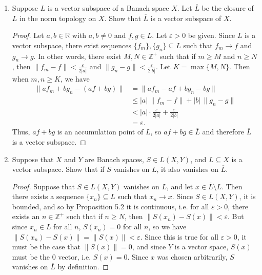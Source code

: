 \documentclass[11pt,oneside,english]{amsart}
\theoremstyle{definition}
\newcommand{\ve}{\varepsilon}
\newcommand{\MB}[1]{\mathbb{#1}}
\begin{document}
\rightline{\today}



\vspace{5mm}
\begin{enumerate}
\itemsep7mm





\item Suppose $L$ is a vector subspace of a Banach space $X$. Let $\overline{L}$ be the closure of $L$ in the norm topology on $X$. Show that $\overline{L}$ is a vector subspace of $X$.

\begin{proof}
Let $a,b\in \MB{R}$ with $a,b\neq0$ and $f,g\in \overline{L}$. Let $\ve>0$ be given. Since $L$ is a vector subspace, there exist sequences $\{f_m\},\{g_n\}\subseteq L$ such that $f_m\to f$ and $g_n\to g$. In other words, there exist $M,N\in\MB{Z}^+$ such that if $m\geq M$ and $n\geq N$, then $\|f_m-f\|<\frac{\ve}{2|a|}$ and $\|g_n-g\|<\frac{\ve}{2|b|}$. Let $K=\max\{M,N\}$. Then when $m,n\geq K$, we have
\begin{align*}
\|af_m+bg_n-(af+bg)\|&=\|af_m-af+bg_n-bg\|\\[2mm]
&\leq|a|\,\|f_m-f\|+|b|\,\|g_n-g\|\\[2mm]
&<|a|\cdot\frac{\ve}{2|a|}+\frac{\ve}{2|b|}\\
&=\ve.
\end{align*}
Thus, $af+bg$ is an accumulation point of $L$, so $af+bg\in\overline{L}$ and therefore $\overline{L}$ is a vector subspace.
\end{proof}

\item Suppose that $X$ and $Y$ are Banach spaces, $S \in L(X,Y)$, and $L \subseteq X$ is a vector subspace.  Show that if $S$ vanishes on $L$, it also vanishes on $\overline{L}$.

\begin{proof}
Suppose that $S\in L(X,Y)$ vanishes on $L$, and let $x\in\overline{L}\setminus L$. Then there exists a sequence $\{x_n\}\subseteq L$ such that $x_n\to x$. Since $S\in L(X,Y)$, it is bounded, and so by Proposition 5.2 it is continuous, i.e. for all $\ve>0$, there exists an $n\in\MB{Z}^+$ such that if $n\geq N$, then $\|S(x_n)-S(x)\|<\ve$. But since $x_n\in L$ for all $n$, $S(x_n)=0$ for all $n$, so we have $\|S(x_n)-S(x)\|=\|S(x)\|<\ve$. Since this is true for all $\ve>0$, it must be the case that $\|S(x)\|=0$, and since $Y$ is a vector space, $S(x)$ must be the 0 vector, i.e. $S(x)=0$. Since $x$ was chosen arbitrarily, $S$ vanishes on $\overline{L}$ by definition.
\end{proof}



\end{enumerate}
\end{document}
